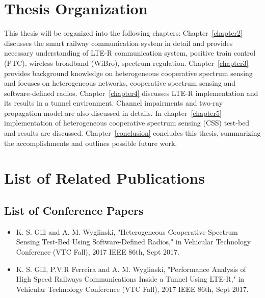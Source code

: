 \section{Thesis Organization}
This thesis will be organized into the following chapters: Chapter~\ref{chapter2} discusses the smart railway communication system in detail and provides necessary understanding of LTE-R communication system, positive train control (PTC), wireless broadband (WiBro), spectrum regulation. Chapter~\ref{chapter3} provides background knowledge on heterogeneous cooperative spectrum sensing and focuses on heterogeneous networks, cooperative spectrum sensing and software-defined radios. Chapter~\ref{chapter4} discusses LTE-R implementation and its results in a tunnel environment. Channel impairments and two-ray propagation model are also discussed in details.  In chapter~\ref{chapter5} implementation of heterogeneous cooperative spectrum sensing (CSS) test-bed and results are discussed. Chapter~\ref{conclusion} concludes this thesis, summarizing the accomplishments and outlines possible future work.

\section{List of Related Publications}
\subsection*{List of Conference Papers}
\begin{itemize}
\item K. S. Gill and A. M. Wyglinski, "Heterogeneous Cooperative Spectrum Sensing
Test-Bed Using Software-Defined Radios," in Vehicular Technology Conference (VTC Fall), 2017 IEEE 86th, Sept 2017.

\item K. S. Gill, P.V.R Ferreira and A. M. Wyglinski, "Performance Analysis of High Speed Railways Communications Inside a Tunnel Using LTE-R," in Vehicular Technology Conference (VTC Fall), 2017 IEEE 86th, Sept 2017.

\end{itemize}


